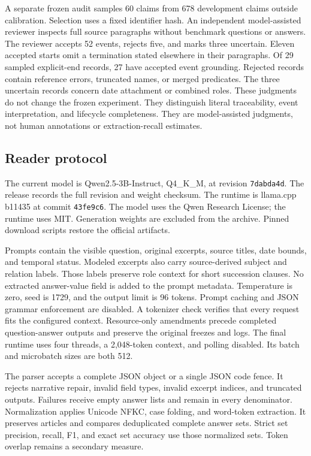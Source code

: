 A separate frozen audit samples 60 claims from 678 development claims outside calibration.
Selection uses a fixed identifier hash.
An independent model-assisted reviewer inspects full source paragraphs without benchmark questions or answers.
The reviewer accepts 52 events, rejects five, and marks three uncertain.
Eleven accepted starts omit a termination stated elsewhere in their paragraphs.
Of 29 sampled explicit-end records, 27 have accepted event grounding.
Rejected records contain reference errors, truncated names, or merged predicates.
The three uncertain records concern date attachment or combined roles.
These judgments do not change the frozen experiment.
They distinguish literal traceability, event interpretation, and lifecycle completeness.
They are model-assisted judgments, not human annotations or extraction-recall estimates.

\subsection{Reader protocol}
\label{app:reader}
The current model is Qwen2.5-3B-Instruct, Q4\_K\_M, at revision \texttt{7dabda4d}.
The release records the full revision and weight checksum.
The runtime is llama.cpp b11435 at commit \texttt{43fe9c6}.
The model uses the Qwen Research License; the runtime uses MIT.
Generation weights are excluded from the archive.
Pinned download scripts restore the official artifacts.

Prompts contain the visible question, original excerpts, source titles, date bounds, and temporal status.
Modeled excerpts also carry source-derived subject and relation labels.
Those labels preserve role context for short succession clauses.
No extracted answer-value field is added to the prompt metadata.
Temperature is zero, seed is 1729, and the output limit is 96 tokens.
Prompt caching and JSON grammar enforcement are disabled.
A tokenizer check verifies that every request fits the configured context.
Resource-only amendments precede completed question-answer outputs and preserve the original freezes and logs.
The final runtime uses four threads, a 2,048-token context, and polling disabled.
Its batch and microbatch sizes are both 512.

The parser accepts a complete JSON object or a single JSON code fence.
It rejects narrative repair, invalid field types, invalid excerpt indices, and truncated outputs.
Failures receive empty answer lists and remain in every denominator.
Normalization applies Unicode NFKC, case folding, and word-token extraction.
It preserves articles and compares deduplicated complete answer sets.
Strict set precision, recall, F1, and exact set accuracy use those normalized sets.
Token overlap remains a secondary measure.

